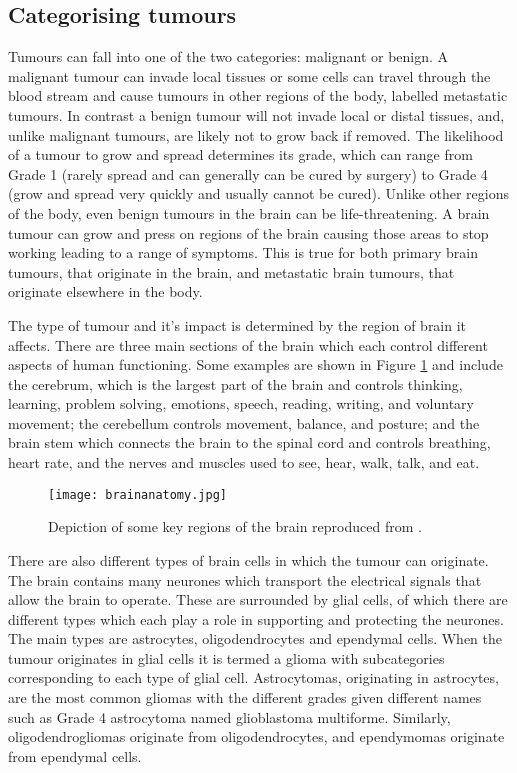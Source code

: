 \subsection{Categorising tumours} 
Tumours can fall into one of the two categories: malignant or benign. A malignant tumour can invade local tissues or some cells can travel through the blood stream and cause tumours in other regions of the body, labelled metastatic tumours. In contrast a benign tumour will not invade local or distal tissues, and, unlike malignant tumours, are likely not to grow back if removed.\cite{Institute2021} The likelihood of a tumour to grow and spread determines its grade, which can range from Grade 1 (rarely spread and can generally can be cured by surgery) to Grade 4 (grow and spread very quickly and usually cannot be cured).\cite{Institute2023} Unlike other regions of the body, even benign tumours in the brain can be life-threatening. A brain tumour can grow and press on regions of the brain causing those areas to stop working leading to a range of symptoms. This is true for both primary brain tumours, that originate in the brain, and metastatic brain tumours, that originate elsewhere in the body.\cite{Institute2021} 

The type of tumour and it's impact is determined by the region of brain it affects. There are three main sections of the brain which each control different aspects of human functioning. Some examples are shown in Figure \ref{fig:anatomybrain} and include the cerebrum, which is the largest part of the brain and controls thinking, learning, problem solving, emotions, speech, reading, writing, and voluntary movement; the cerebellum controls movement, balance, and posture; and the brain stem which connects the brain to the spinal cord and controls breathing, heart rate, and the nerves and muscles used to see, hear, walk, talk, and eat.\cite{Institute2023}
\begin{figure}[ht]
    \centering
    \texttt{[image: brainanatomy.jpg]}
    \caption{Depiction of some key regions of the brain reproduced from \cite{Institute2023}.}
    \label{fig:anatomybrain}
\end{figure}
There are also different types of brain cells in which the tumour can originate. The brain contains many neurones which transport the electrical signals that allow the brain to operate. These are surrounded by glial cells, of which there are different types which each play a role in supporting and protecting the neurones. \cite{TheBrainTumourCharity2023} The main types are astrocytes, oligodendrocytes and ependymal cells. When the tumour originates in glial cells it is termed a glioma with subcategories corresponding to each type of glial cell. Astrocytomas, originating in astrocytes, are the most common gliomas with the different grades given different names such as Grade 4 astrocytoma named glioblastoma multiforme.\cite{BrainTumourResearch2023} Similarly, oligodendrogliomas originate from oligodendrocytes, and ependymomas originate from ependymal cells.\cite{TheBrainTumourCharity2023} %

